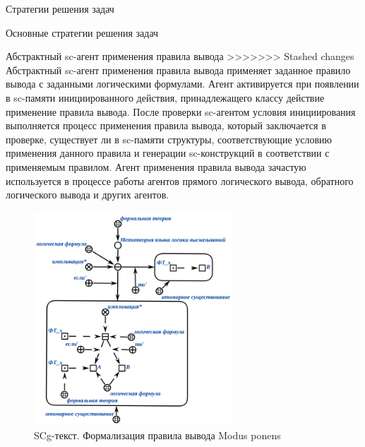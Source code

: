 \begin{frame}{Стратегии решения задач}
\begin{frame}{\large Основные стратегии решения задач}
\begin{textitemize}
\begin{frame}{Абстрактный sc-агент применения правила вывода}
>>>>>>> Stashed changes
  Абстрактный sc-агент применения правила вывода применяет заданное правило вывода с заданными логическими формулами. Агент активируется при появлении в sc-памяти инициированного действия, принадлежащего классу действие применение правила вывода. После проверки sc-агентом условия инициирования выполняется процесс применения правила вывода, который заключается в проверке, существует ли в sc-памяти структуры, соответствующие условию применения данного правила и генерации sc-конструкций в соответствии с применяемым правилом. Агент применения правила вывода зачастую используется в процессе работы агентов прямого логического вывода, обратного логического вывода и других агентов.  
\end{frame}

\begin{frame}{}
\begin{figure}[H]
	\caption{SCg-текст. Формализация правила вывода Modus ponens}
	\includegraphics[width=0.9\linewidth, height=8cm]{figures/sc-agents/Modus_ponens.png}
\end{figure}
\end{frame}


\end{textitemize}
\end{frame}
\end{frame}
